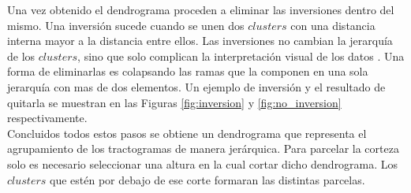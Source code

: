 Una vez obtenido el dendrograma proceden a eliminar las inversiones dentro
del mismo. Una inversi\'on sucede cuando se unen dos $clusters$ con una
distancia interna mayor a la distancia entre ellos. Las inversiones no
cambian la jerarqu\'ia de los $clusters$, sino que solo complican la
interpretaci\'on visual de los datos \cite{Murtagh1985}. Una forma de
eliminarlas es colapsando las ramas que la componen en una sola jerarqu\'ia
con mas de dos elementos. Un ejemplo de inversi\'on y el resultado de
quitarla se muestran en las Figuras  \ref{fig:inversion} y 
\ref{fig:no_inversion} respectivamente. \\

Concluidos todos estos pasos se obtiene un dendrograma que representa 
el agrupamiento de los tractogramas de manera jer\'arquica. Para parcelar
la corteza solo es necesario seleccionar una altura en la cual cortar
dicho dendrograma. Los $clusters$ que est\'en por debajo de ese
corte formaran las distintas parcelas. \\
